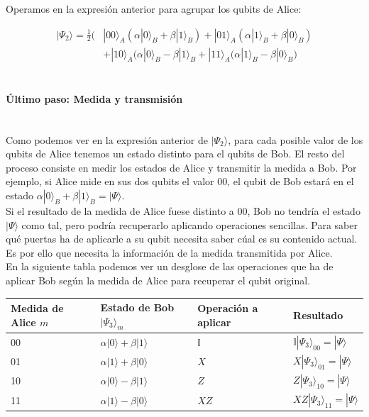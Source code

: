 \documentclass[11pt]{article}
\newcommand{\I}{\mathbb{I}}
\newcommand{\ra}{\rangle}
\newcommand{\myparagraph}[1]{\paragraph*{ \\ #1}\mbox{}\\}
\theoremstyle{plain}
\begin{document}
Operamos en la expresión anterior para agrupar los qubits de Alice:

\begin{align*}
|\Psi_2\ra  = \frac{1}{2} \bigg( 	& |00\ra_A (\alpha|0\ra_B + \beta|1\ra_B) + |01\ra_A (\alpha|1\ra_B + \beta|0\ra_B) \\
			 						& + |10\ra_A (\alpha|0\ra_B - \beta|1\ra_B + |11\ra_A (\alpha|1\ra_B - \beta|0\ra_B \bigg)
\end{align*}

\myparagraph{Último paso: Medida y transmisión}

Como podemos ver en la expresión anterior de $|\Psi_2\ra$, para cada posible valor de los qubits de Alice tenemos un estado distinto para el qubits de Bob. El resto del proceso consiste en medir los estados de Alice y transmitir la medida a Bob. Por ejemplo, si Alice mide en sus dos qubits el valor $00$, el qubit de Bob estará en el estado $\alpha|0\ra_B + \beta|1\ra_B = |\Psi\ra$. \\

Si el resultado de la medida de Alice fuese distinto a $00$, Bob no tendría el estado $|\Psi\ra$ como tal, pero podría recuperarlo aplicando operaciones sencillas. Para saber qué puertas ha de aplicarle a su qubit necesita saber cúal es su contenido actual. Es por ello que necesita la información de la medida transmitida por Alice. \\

En la siguiente tabla podemos ver un desglose de las operaciones que ha de aplicar Bob según la medida de Alice para recuperar el qubit original.

\begin{table}[H]
	\begin{tabular}{llll}
		\textbf{Medida de Alice $m$} & \textbf{Estado de Bob $|\Psi_3\ra_m$} & \textbf{Operación a aplicar} & \textbf{Resultado}                               \\ \hline
		00                           & $\alpha|0\ra + \beta|1\ra$                            & $\I$                         & $\I |\Psi _3\ra_{00} = |\Psi\ra$ \\
		01                           & $\alpha|1\ra + \beta|0\ra$                            & $X$                          & $X |\Psi _3\ra_{01} = |\Psi\ra$  \\
		10                           & $\alpha|0\ra - \beta|1\ra$                            & $Z$                          & $Z |\Psi _3\ra_{10} = |\Psi\ra$  \\
		11                           & $\alpha|1\ra - \beta|0\ra$                            & $XZ$                         & $XZ |\Psi _3\ra_{11} = |\Psi\ra$
	\end{tabular}
\end{table}
\end{document}
